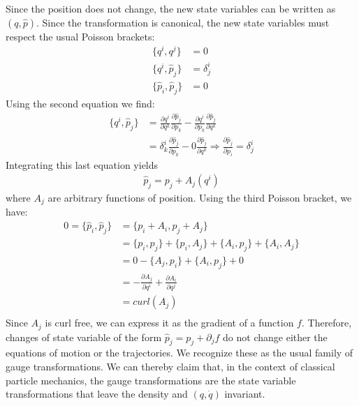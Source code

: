 \documentclass[12pt, english, twoside]{article} %
\begin{document}
Since the position does not change, the new state variables can be written as $(q, \hat{p})$. Since the transformation is canonical, the new state variables must respect the usual Poisson brackets:
\begin{equation}
\begin{aligned}
	\{q^i, q^j\} &= 0 \\
	\{q^i, \hat{p}_j\} &= \delta^i_j \\
	\{\hat{p}_i, \hat{p}_j\} &= 0
\end{aligned}
\end{equation}
Using the second equation we find:
\begin{equation}
\begin{aligned}
	\{q^i, \hat{p}_j\} &= \frac{\partial q^i}{\partial q^k} \frac{\partial \hat{p}_j}{\partial p_k} - \frac{\partial q^i}{\partial p_k} \frac{\partial \hat{p}_j}{\partial q^k} \\
	&= \delta^i_k \frac{\partial \hat{p}_j}{\partial p_k} - 0 \frac{\partial \hat{p}_j}{\partial q^k} \Rightarrow \frac{\partial \hat{p}_j}{\partial p_i} = \delta^i_j
\end{aligned}
\end{equation}
Integrating this last equation yields
\begin{equation}
\begin{aligned}
\hat{p}_j = p_j + A_j(q^i)
\end{aligned}
\end{equation}
where $A_j$ are arbitrary functions of position. Using the third Poisson bracket, we have:
\begin{equation}
\begin{aligned}
0 = \{\hat{p}_i, \hat{p}_j\} &= \{p_i + A_i, p_j + A_j\} \\
&= \{p_i, p_j \} + \{p_i , A_j\} + \{A_i, p_j \} + \{A_i, A_j\} \\
&= 0 - \{A_j, p_i\} + \{A_i, p_j \} + 0 \\
&= - \frac{\partial A_j}{\partial q^i} + \frac{\partial A_i}{\partial q^j} \\
&= curl(A_j) \\
\end{aligned}
\end{equation}
Since $A_j$ is curl free, we can express it as the gradient of a function $f$. Therefore, changes of state variable of the form $\hat{p}_j = p_j + \partial_j f$ do not change either the equations of motion or the trajectories. We recognize these as the usual family of gauge transformations. We can thereby claim that, in the context of classical particle mechanics, the gauge transformations are the state variable transformations that leave the density and $(q,\dot{q}) $ invariant.
\end{document}
